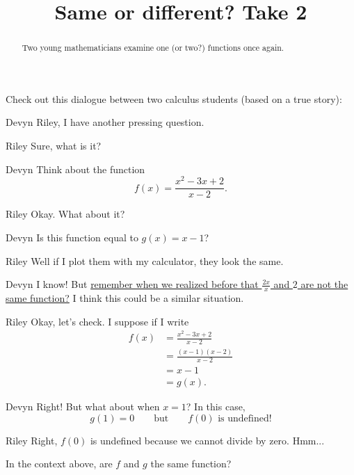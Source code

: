 \documentclass{ximera}
\title[Break-Ground:]{Same or different? Take 2}
\begin{document}
\begin{abstract}
  Two young mathematicians examine one (or two?)  functions once again.
\end{abstract}
\maketitle

Check out this dialogue between two calculus students (based on a true
story):

\begin{dialogue}
\item[Devyn] Riley, I have another pressing question.
\item[Riley] Sure, what is it?
\item[Devyn] Think about the function
\[ f(x) = \frac{x^2-3x+2}{x-2}. \]
\item[Riley] Okay.  What about it?
\item[Devyn] Is this function equal to $g(x) = x-1$?
\item[Riley] Well if I plot them with my calculator, they look the
  same.
\item[Devyn] I know!  But \href{https://ximera.osu.edu/math160fa17/m160prerequisites/understandingFunctions/breakGround}{remember when we realized before that $\frac{2x}{x}$ and $2$ are not the same function?}  I think this could be a similar situation.
\item[Riley] Okay, let's check.  I suppose if I write
  \begin{align*}
    f(x) &= \frac{x^2-3x+2}{x-2} \\
    &= \frac{(x-1)(x-2)}{x-2} \\
    &= x-1 \\
    &= g(x).
  \end{align*}
\item[Devyn] Right! But what about when $x=1$? In this case,
  \[
  g(1) = 0\qquad\text{but}\qquad f(0) \text{ is undefined!}
  \]
\item[Riley] Right, $f(0)$ is undefined because we cannot divide by
  zero. Hmm... 
\end{dialogue}

\begin{problem}
  In the context above, are $f$ and $g$ the same function?
  \begin{multipleChoice}
  \end{multipleChoice}
\end{problem}
\end{document}

